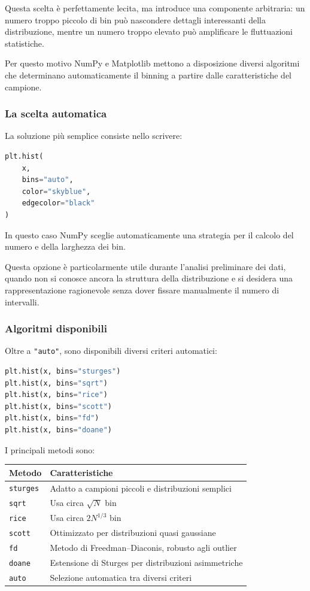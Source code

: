 \documentclass[11pt,a4paper]{book}
\begin{document}
Questa scelta è perfettamente lecita, ma introduce una componente
arbitraria: un numero troppo piccolo di bin può nascondere dettagli
interessanti della distribuzione, mentre un numero troppo elevato può
amplificare le fluttuazioni statistiche.

Per questo motivo NumPy e Matplotlib mettono a disposizione diversi
algoritmi che determinano automaticamente il binning a partire dalle
caratteristiche del campione.

\subsubsection{La scelta automatica}

La soluzione più semplice consiste nello scrivere:

\begin{lstlisting}[language=Python]
plt.hist(
    x,
    bins="auto",
    color="skyblue",
    edgecolor="black"
)
\end{lstlisting}

In questo caso NumPy sceglie automaticamente una strategia per il
calcolo del numero e della larghezza dei bin.

Questa opzione è particolarmente utile durante l'analisi preliminare dei
dati, quando non si conosce ancora la struttura della distribuzione e si
desidera una rappresentazione ragionevole senza dover fissare
manualmente il numero di intervalli.

\subsubsection{Algoritmi disponibili}

Oltre a \texttt{"auto"}, sono disponibili diversi criteri automatici:

\begin{lstlisting}[language=Python]
plt.hist(x, bins="sturges")
plt.hist(x, bins="sqrt")
plt.hist(x, bins="rice")
plt.hist(x, bins="scott")
plt.hist(x, bins="fd")
plt.hist(x, bins="doane")
\end{lstlisting}

I principali metodi sono:

\begin{center}
\begin{tabular}{ll}
\toprule
Metodo & Caratteristiche \\
\midrule
\texttt{sturges} &
Adatto a campioni piccoli e distribuzioni semplici \\
\texttt{sqrt} &
Usa circa $\sqrt{N}$ bin \\
\texttt{rice} &
Usa circa $2N^{1/3}$ bin \\
\texttt{scott} &
Ottimizzato per distribuzioni quasi gaussiane \\
\texttt{fd} &
Metodo di Freedman--Diaconis, robusto agli outlier \\
\texttt{doane} &
Estensione di Sturges per distribuzioni asimmetriche \\
\texttt{auto} &
Selezione automatica tra diversi criteri \\
\bottomrule
\end{tabular}
\end{center}
\end{document}
